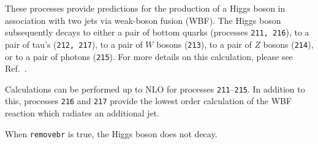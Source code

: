 \label{subsec:wbf}

These processes provide predictions for the production of a Higgs boson in
association with two jets via weak-boson fusion (WBF). The Higgs boson
subsequently decays to either a pair of bottom quarks
(processes {\tt 211, 216}), to a pair of tau's ({\tt 212, 217}),
to a pair of $W$ bosons ({\tt 213}),
to a pair of $Z$ bosons ({\tt 214}),
or to a pair of photons ({\tt 215}).
For more details on this calculation, please see Ref.~\cite{Berger:2004pca}.

Calculations can be performed up to NLO for processes {\tt 211}--{\tt 215}.
In addition to this, processes {\tt 216} and {\tt 217} provide the lowest
order calculation of the WBF reaction which radiates an additional jet.

When {\tt removebr} is true, the Higgs boson does not decay.
